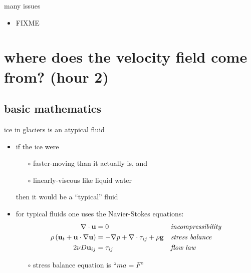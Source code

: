 \documentclass[10pt,dvipsnames]{beamer}
\begin{document}
\begin{frame}{many issues}
\begin{itemize}
\item FIXME
\end{itemize}
\end{frame}


\section[where does the velocity field come from?]{\textbf{where does the velocity field come from?} (hour 2)}

\subsection{basic mathematics}

\begin{frame}{ice in glaciers is an atypical fluid}

\begin{itemize}
\item if the ice were
  \begin{itemize}
  \item[$\circ$] faster-moving than it actually is, and
  \item[$\circ$] linearly-viscous like liquid water
  \end{itemize}

  then it would be a ``typical'' fluid

\bigskip
\item for typical fluids one uses the Navier-Stokes equations:
\begin{align*}
\nabla \cdot \mathbf{u} &= 0 &&\text{\emph{incompressibility}} \\
\rho \left(\mathbf{u}_t + \mathbf{u}\cdot\nabla \mathbf{u}\right) &= -\nabla p + \nabla \cdot \tau_{ij} + \rho \mathbf{g} &&\text{\emph{stress balance}} \\
2 \nu D\mathbf{u}_{ij} &= \tau_{ij} &&\text{\emph{flow law}}
\end{align*}

\medskip
    \begin{itemize}
    \item[$\circ$] stress balance equation is ``$m a = F$''
    \end{itemize}
\end{itemize}
\end{frame}
\end{document}
